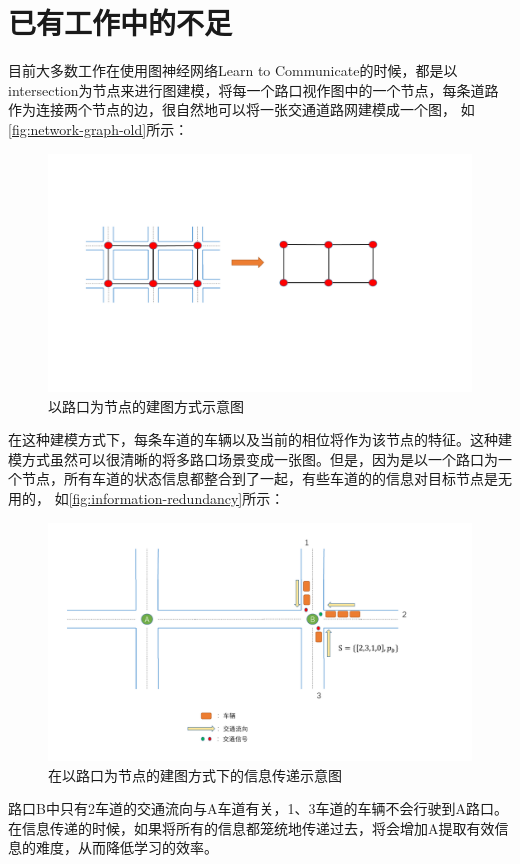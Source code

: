 \section{已有工作中的不足}
目前大多数工作在使用图神经网络Learn to Communicate的时候，都是以intersection为节点来进行图建模，将每一个路口视作图中的一个节点，每条道路作为连接两个节点的边，很自然地可以将一张交通道路网建模成一个图， 如\autoref{fig:network-graph-old}所示：
\begin{figure}[htb]
  \includegraphics[width=1.2\textwidth]{ppt/network-graph.pdf}
  \caption{以路口为节点的建图方式示意图}
  \label{fig:network-graph-old}
\end{figure}
在这种建模方式下，每条车道的车辆以及当前的相位将作为该节点的特征。这种建模方式虽然可以很清晰的将多路口场景变成一张图。但是，因为是以一个路口为一个节点，所有车道的状态信息都整合到了一起，有些车道的的信息对目标节点是无用的，
如\autoref{fig:information-redundancy}所示：
\begin{figure}[htb]
  \includegraphics[width=1.2\textwidth]{ppt/information-redundancy.pdf}
  \caption{在以路口为节点的建图方式下的信息传递示意图}
  \label{fig:information-redundancy}
\end{figure}
路口B中只有2车道的交通流向与A车道有关，1、3车道的车辆不会行驶到A路口。在信息传递的时候，如果将所有的信息都笼统地传递过去，将会增加A提取有效信息的难度，从而降低学习的效率。

